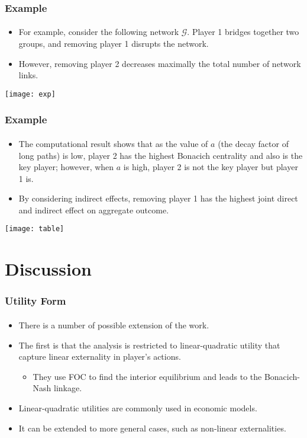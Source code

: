 \documentclass{beamer}
\newcommand{\hl}[1]{\textcolor{myblue}{#1}}
\newcommand{\eug}{\mathscr{G}}
\begin{document}
\begin{frame}%
    \frametitle{Example}
    \framesubtitle{}
    \begin{itemize}
        \item For example, consider the following network $\eug$. Player 1 bridges together
            two groups, and removing player 1 disrupts the network.
        \item However, removing player 2 decreases maximally the total number of network links.
    \end{itemize}
    \texttt{[image: exp]}
\end{frame}

\begin{frame}%
    \frametitle{Example}
    \framesubtitle{}
    \begin{itemize}
        \item The computational result shows that as the value of $a$ (the decay factor of long paths)
            is low, player 2 has the highest Bonacich centrality and also is the key player;
            however, when $a$ is high, player 2 is not the key player but player 1 is.
        \item By considering indirect effects, removing player 1 has the highest joint direct
            and indirect effect on \hl{aggregate outcome}.
    \end{itemize}
    \centering
    \texttt{[image: table]}
\end{frame}

\section{Discussion}
\begin{frame}[label=current]
    \frametitle{Utility Form}
    \framesubtitle{}
    \begin{itemize}
        \item There is a number of possible extension of the work.
        \item The first is that the analysis is restricted to linear-quadratic utility that
            capture linear externality in player's actions.
            \begin{itemize}
                \item They use FOC to find the interior equilibrium and leads to the Bonacich-Nash
                    linkage.
            \end{itemize}
        \item Linear-quadratic utilities are commonly used in economic models.
        \item It can be extended to more general cases, such as non-linear externalities.
    \end{itemize}
\end{frame}
\end{document}
